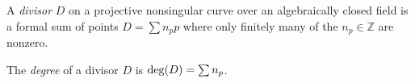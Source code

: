 \documentclass{article}
\begin{document}
A {\em divisor} $D$ on a projective nonsingular curve over an algebraically closed field is a formal sum of points $D = \sum n_p p$ where only finitely many of the $n_p\in\mathbb{Z}$ are nonzero.

The {\em degree} of a divisor $D$ is ${\rm deg}(D) = \sum n_p$.
\end{document}
